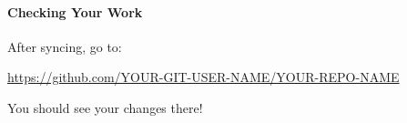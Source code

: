 \documentclass{ximera}
\begin{document}
\begin{multicols}{2}
    \paragraph{Checking Your Work}

    After syncing, go to:
    \begin{center}
        \url{https://github.com/YOUR-GIT-USER-NAME/YOUR-REPO-NAME}
    \end{center}
    You should see your changes there!
\end{multicols}
\twocolumn
\end{document}
